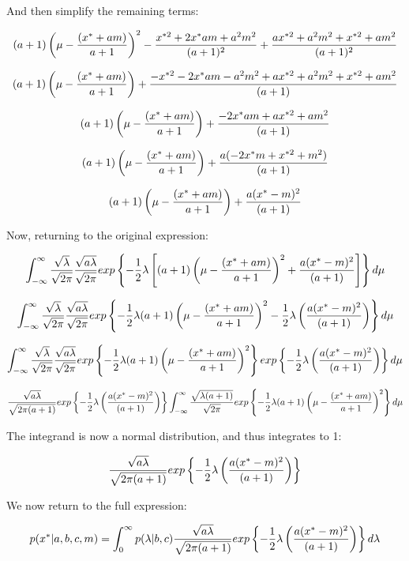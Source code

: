 \documentclass[twoside,11pt]{homework}
\begin{document}
And then simplify the remaining terms:

\[
(a + 1)
\left(\mu - \frac{(x^* + am)}{a+1}\right)^2
- \frac{x^{*2} + 2x^*am + a^2m^2}{(a+1)^2} + \frac{ax^{*2} + a^2m^2 + x^{*2} + am^2}{(a + 1)^2}
\]

\[
(a + 1)
\left(\mu - \frac{(x^* + am)}{a+1}\right)
+ \frac{- x^{*2} - 2x^*am - a^2m^2 + ax^{*2} + a^2m^2 + x^{*2} + am^2}{(a + 1)}
\]

\[
(a + 1)
\left(\mu - \frac{(x^* + am)}{a+1}\right)
+ \frac{- 2x^*am + ax^{*2} + am^2}{(a + 1)}
\]

\[
(a + 1)
\left(\mu - \frac{(x^* + am)}{a+1}\right)
+ \frac{a(-2x^*m + x^{*2} + m^2)}{(a + 1)}
\]

\[
(a + 1)
\left(\mu - \frac{(x^* + am)}{a+1}\right)
+ \frac{a(x^* - m)^2}{(a + 1)}
\]

Now, returning to the original expression:

\[
\int_{-\infty}^{\infty}
\frac{\sqrt{\lambda}}{\sqrt{2\pi}}
\frac{\sqrt{a\lambda}}{\sqrt{2\pi}}
exp\left\{-\frac{1}{2}\lambda
\left[
(a + 1)
\left(\mu - \frac{(x^* + am)}{a+1}\right)^2
+ \frac{a(x^* - m)^2}{(a + 1)}\right]
\right\}
d\mu
\]

\[
\int_{-\infty}^{\infty}
\frac{\sqrt{\lambda}}{\sqrt{2\pi}}
\frac{\sqrt{a\lambda}}{\sqrt{2\pi}}
exp\left\{
-\frac{1}{2}\lambda
(a + 1)
\left(\mu - \frac{(x^* + am)}{a+1}\right)^2
- \frac{1}{2}\lambda
\left(\frac{a(x^* - m)^2}{(a + 1)}\right)
\right\}
d\mu
\]

\[
\int_{-\infty}^{\infty}
\frac{\sqrt{\lambda}}{\sqrt{2\pi}}
\frac{\sqrt{a\lambda}}{\sqrt{2\pi}}
exp\left\{
-\frac{1}{2}\lambda
(a + 1)
\left(\mu - \frac{(x^* + am)}{a+1}\right)^2
\right\}
exp\left\{
- \frac{1}{2}\lambda
\left(\frac{a(x^* - m)^2}{(a + 1)}\right)
\right\}
d\mu
\]

\[
\frac{\sqrt{a\lambda}}{\sqrt{2\pi(a+1)}}
exp\left\{
- \frac{1}{2}\lambda
\left(\frac{a(x^* - m)^2}{(a + 1)}\right)
\right\}
\int_{-\infty}^{\infty}
\frac{\sqrt{\lambda(a+1)}}{\sqrt{2\pi}}
exp\left\{
-\frac{1}{2}\lambda
(a + 1)
\left(\mu - \frac{(x^* + am)}{a+1}\right)^2
\right\}
d\mu
\]

The integrand is now a normal distribution, and thus integrates to 1:

\[
\frac{\sqrt{a\lambda}}{\sqrt{2\pi(a+1)}}
exp\left\{
- \frac{1}{2}\lambda
\left(
\frac{a(x^* - m)^2}{(a + 1)}
\right)
\right\}
\]

We now return to the full expression:

\[
p(x^*|a, b, c, m) =
\int_{0}^{\infty}
p(\lambda | b, c )
\frac{\sqrt{a\lambda}}{\sqrt{2\pi(a+1)}}
exp\left\{
- \frac{1}{2}\lambda
\left(
\frac{a(x^* - m)^2}{(a + 1)}
\right)
\right\}d\lambda
\]
\end{document}
